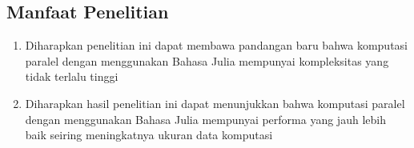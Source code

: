 \subsection{Manfaat Penelitian}
\begin{enumerate}
  \item Diharapkan penelitian ini dapat membawa pandangan baru bahwa komputasi paralel
        dengan menggunakan Bahasa Julia mempunyai kompleksitas yang tidak terlalu
        tinggi

  \item Diharapkan hasil penelitian ini dapat menunjukkan bahwa komputasi paralel
        dengan menggunakan Bahasa Julia mempunyai performa yang jauh lebih baik seiring
        meningkatnya ukuran data komputasi
\end{enumerate}